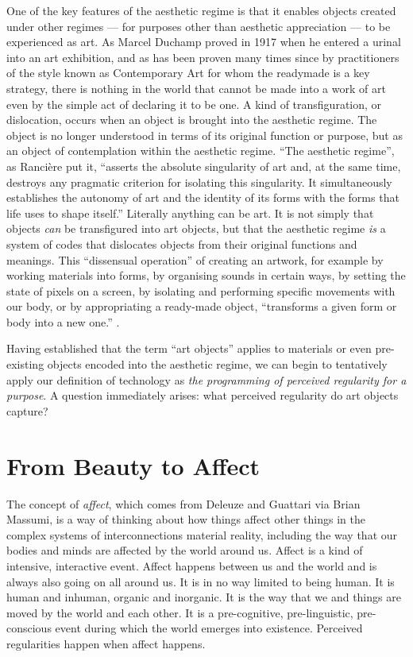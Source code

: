 \documentclass[letterpaper]{article}
\begin{document}
    One of the key features of the aesthetic regime is that it enables objects created under other regimes — for purposes other than aesthetic appreciation — to be experienced as art. As Marcel Duchamp proved in 1917 when he entered a urinal into an art exhibition, and as has been proven many times since by practitioners of the style known as Contemporary Art for whom the readymade is a key strategy, there is nothing in the world that cannot be made into a work of art even by the simple act of declaring it to be one. A kind of transfiguration, or dislocation, occurs when an object is brought into the aesthetic regime. The object is no longer understood in terms of its original function or purpose, but as an object of contemplation within the aesthetic regime. “The aesthetic regime”, as Rancière put it, “asserts the absolute singularity of art and, at the same time, destroys any pragmatic criterion for isolating this singularity. It simultaneously establishes the autonomy of art and the identity of its forms with the forms that life uses to shape itself.” Literally anything can be art. It is not simply that objects \emph{can} be transfigured into art objects, but that the aesthetic regime \emph{is} a system of codes that dislocates objects from their original functions and meanings. This “dissensual operation” of creating an artwork, for example by working materials into forms, by organising sounds in certain ways, by setting the state of pixels on a screen, by isolating and performing specific movements with our body, or by appropriating a ready-made object, “transforms a given form or body into a new one.” \citep[p.54]{RancierThEmncptdSpcttr2009}.

    Having established that the term “art objects” applies to materials or even pre-existing objects encoded into the aesthetic regime, we can begin to tentatively apply our definition of technology as \emph{the programming of perceived regularity for a purpose}. A question immediately arises: what perceived regularity do art objects capture?

\section{From Beauty to Affect}

    The concept of \emph{affect}, which comes from Deleuze and Guattari via Brian Massumi, is a way of thinking about how things affect other things in the complex systems of interconnections material reality, including the way that our bodies and minds are affected by the world around us. Affect is a kind of intensive, interactive event. Affect happens between us and the world and is always also going on all around us. It is in no way limited to being human. It is human and inhuman, organic and inorganic. It is the way that we and things are moved by the world and each other. It is a pre-cognitive, pre-linguistic, pre-conscious event during which the world emerges into existence. Perceived regularities happen when affect happens.
    
\end{document}
